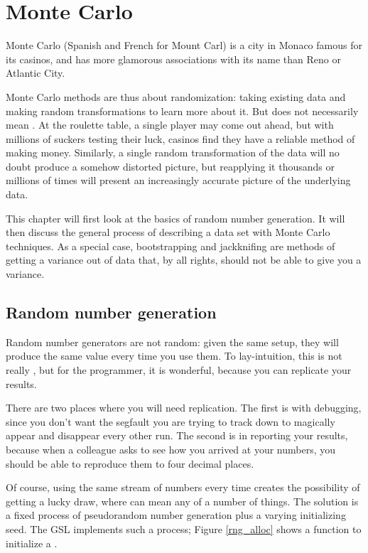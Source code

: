 \startonecol \chapter{Monte Carlo} \label{boot} \endonecol

Monte Carlo (Spanish and French for Mount Carl) is a city in Monaco
famous for its casinos, and has more glamorous associations with its name
than Reno or Atlantic City.

Monte Carlo methods are thus about randomization: taking existing data
and making random transformations to learn more about it. But
 does not necessarily mean .
At the
roulette table, a single player may come out ahead, but with millions of
suckers testing their luck, casinos find they have a reliable method of
making money.  Similarly, a single random transformation of the data will
no doubt produce a somehow distorted picture, but reapplying it thousands
or millions of times will present an increasingly accurate picture of
the underlying data.

This chapter will first look at the basics of random number generation.
It will then discuss the general process of describing a data set with
Monte Carlo techniques.  As a special case,
bootstrapping and jackknifing are methods of getting a variance out of
data that, by all rights, should not be able to give you a variance. 

\section{Random number generation}\label{randomnumbers}
Random number generators are not random: given the same setup, they
will produce the same value every time you use them. To lay-intuition,
this is not really , but for the programmer, it is wonderful,
because you can replicate your results.

There are two places where you will need replication. The first is with
debugging, since you don't want the segfault you are trying to track
down to magically appear and disappear every other run. The second is
in reporting your results, because when a colleague asks to see how you
arrived at your numbers, you should be able to reproduce them to four
decimal places.

Of course, using the same stream of numbers every time creates the
possibility of getting a lucky draw, where  can mean any of a
number of things. The solution is a fixed process of pseudorandom
number generation plus a varying initializing seed. The GSL implements
such a process; Figure \ref{rng_alloc} shows a function
to initialize a .

